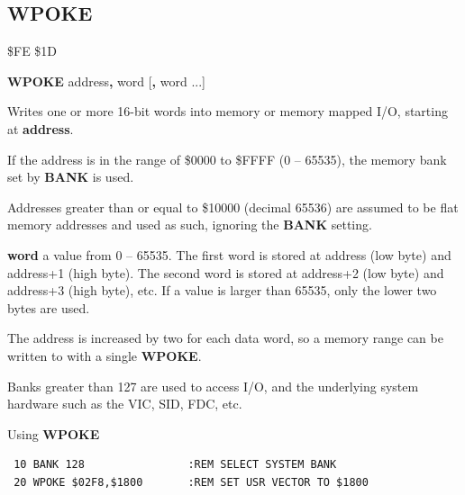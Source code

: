 \subsection{WPOKE}
\begin{description}[leftmargin=2cm,style=nextline]
\item [Token:] \$FE \$1D
\item [Format:] {\bf WPOKE} address{\bf,} word [{\bf,} word ...]
\item [Returns:]  Writes one or more 16-bit words into memory
                or memory mapped I/O, starting at {\bf address}.

                If the address is in the range of \$0000 to \$FFFF (0 -- 65535), the
                memory bank set by {\bf BANK} is used.

                Addresses greater than or equal to \$10000 (decimal 65536) are assumed to be flat memory
                addresses and used as such, ignoring the {\bf BANK} setting.

                {\bf word} a value from 0 -- 65535. The first word is stored
                at address (low byte) and address+1 (high byte). The second
                word is stored at address+2 (low byte) and address+3 (high
                byte), etc. If a value is larger than 65535, only the lower
                two bytes are used.

\item [Remarks:] The address is increased by two for each data word,
                 so a memory range can be written to with a single {\bf WPOKE}.

                Banks greater than 127 are used to access I/O, and the underlying system hardware such as the
                VIC, SID, FDC, etc.
\item [Example:] Using {\bf WPOKE}

\begin{tcolorbox}[colback=black,coltext=white]
\verbatimfont{\codefont}
\begin{verbatim}
 10 BANK 128                :REM SELECT SYSTEM BANK
 20 WPOKE $02F8,$1800       :REM SET USR VECTOR TO $1800
\end{verbatim}
\end{tcolorbox}
\end{description}


\newpage

